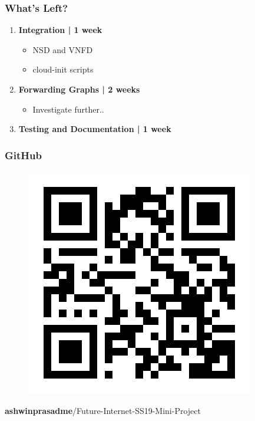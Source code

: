 \documentclass{beamer}
\begin{document}
\begin{frame}
\frametitle{What's Left?}

\begin{enumerate}
	\item \textbf{Integration | 1 week}\\
	\begin{itemize}
		\item NSD and VNFD
		\item cloud-init scripts
	\end{itemize} \pause

	\item \textbf{Forwarding Graphs | 2 weeks}\\
	\begin{itemize}
		\item Investigate further..
	\end{itemize} \pause
	
	\item \textbf{Testing and Documentation | 1 week}\\
	
\end{enumerate}

\end{frame}

\begin{frame}
\frametitle{GitHub}

\begin{figure}
	\centering
	\includegraphics[width=0.5\linewidth]{images/gihubqr}
	\label{fig:gihubqr}
\end{figure}

\large{\centerline{\textbf{ashwinprasadme}/Future-Internet-SS19-Mini-Project}}

\end{frame}
\end{document}
